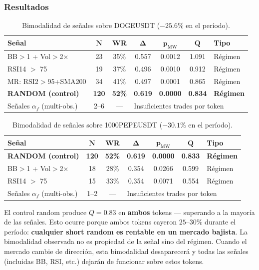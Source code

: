 \documentclass[11pt,a4paper]{article}
\newcommand{\af}{\alpha_f}
\begin{document}
\subsubsection{Resultados}

\begin{table}[H]
\centering
\caption{Bimodalidad de se\~nales sobre DOGEUSDT ($-25.6\%$ en el per\'iodo).}
\label{tab:doge_exp}
\begin{tabular}{lcccccl}
\toprule
\textbf{Se\~nal} & $\bm{N}$ & \textbf{WR} & $\bm{\Delta}$ & $\bm{p}_{\text{MW}}$ & $\bm{Q}$ & \textbf{Tipo} \\
\midrule
BB$>$1 + Vol$>$2$\times$ & 23 & 35\% & 0.557 & 0.0012 & 1.091 & R\'egimen \\
RSI14 $>$ 75 & 19 & 37\% & 0.496 & 0.0010 & 0.912 & R\'egimen \\
MR: RSI2$>$95+SMA200 & 34 & 41\% & 0.497 & 0.0001 & 0.865 & R\'egimen \\
\textbf{RANDOM (control)} & \textbf{120} & \textbf{52\%} & \textbf{0.619} & \textbf{0.0000} & \textbf{0.834} & \textbf{R\'egimen} \\
\midrule
Se\~nales $\af$ (multi-obs.) & 2--6 & --- & \multicolumn{4}{l}{Insuficientes trades por token} \\
\bottomrule
\end{tabular}
\end{table}

\begin{table}[H]
\centering
\caption{Bimodalidad de se\~nales sobre 1000PEPEUSDT ($-30.1\%$ en el per\'iodo).}
\label{tab:pepe_exp}
\begin{tabular}{lcccccl}
\toprule
\textbf{Se\~nal} & $\bm{N}$ & \textbf{WR} & $\bm{\Delta}$ & $\bm{p}_{\text{MW}}$ & $\bm{Q}$ & \textbf{Tipo} \\
\midrule
\textbf{RANDOM (control)} & \textbf{120} & \textbf{52\%} & \textbf{0.619} & \textbf{0.0000} & \textbf{0.833} & \textbf{R\'egimen} \\
BB$>$1 + Vol$>$2$\times$ & 18 & 28\% & 0.354 & 0.0266 & 0.599 & R\'egimen \\
RSI14 $>$ 75 & 15 & 33\% & 0.354 & 0.0071 & 0.554 & R\'egimen \\
\midrule
Se\~nales $\af$ (multi-obs.) & 1--2 & --- & \multicolumn{4}{l}{Insuficientes trades por token} \\
\bottomrule
\end{tabular}
\end{table}

\begin{tcolorbox}[redbox, title=Hallazgo Cr\'itico: El Random Gana]
El control random produce $Q = 0.83$ en \textbf{ambos} tokens ---
superando a la mayor\'ia de las se\~nales. Esto ocurre porque ambos
tokens cayeron $25$--$30\%$ durante el per\'iodo: \textbf{cualquier
short random es rentable en un mercado bajista}. La bimodalidad
observada no es propiedad de la se\~nal sino del r\'egimen. Cuando
el mercado cambie de direcci\'on, esta bimodalidad desaparecer\'a y
todas las se\~nales (incluidas BB, RSI, etc.) dejar\'an de funcionar
sobre estos tokens.
\end{tcolorbox}
\end{document}
